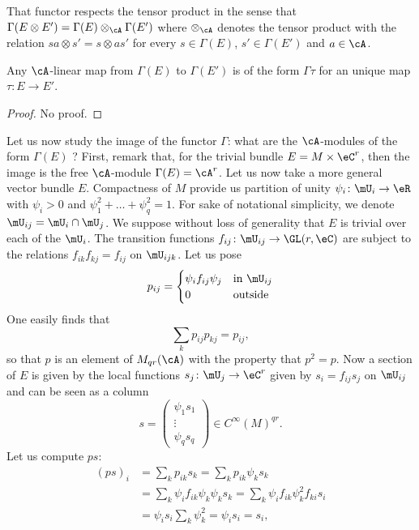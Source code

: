 That functor respects the tensor product in the sense that $\Gamma(E\otimes E')=\Gamma(E)\otimes_{\cA}\Gamma(E')$ where $\otimes_{\cA}$ denotes the tensor product with the relation $sa\otimes s'=s\otimes as'$ for every $s\in\Gamma(E)$, $s'\in\Gamma(E')$ and $a\in\cA$.

\begin{proposition}
Any $\cA$-linear map from $\Gamma(E)$ to $\Gamma(E')$ is of the form $\Gamma\tau$ for an unique map $\tau\colon E\to E'$.
\end{proposition}

\begin{proof}
No proof.
\end{proof}

Let us now study the image of the functor $\Gamma$: what are the $\cA$-modules of the form $\Gamma(E)$ ? First, remark that, for the trivial bundle $E=M\times\eC^r$, then the image is the free $\cA$-module $\Gamma(E)=\cA^r$. Let us now take a more general vector bundle $E$. Compactness of $M$ provide us partition of unity $\psi_i\colon  \mU_i\to \eR$ with $\psi_i>0$ and $\psi_1^2+\ldots+\psi_q^2=1$. For sake of notational simplicity, we denote $\mU_{ij}=\mU_i\cap\mU_j$.  We suppose without loss of generality that $E$ is trivial over each of the $\mU_i$. The transition functions $f_{ij}\colon \mU_{ij}\to \GL(r,\eC)$ are subject to the relations $f_{ik}f_{kj}=f_{ij}$ on $\mU_{ijk}$. Let us pose
\begin{equation}
 p_{ij}=
\begin{cases}
	\psi_if_{ij}\psi_j&\text{in $\mU_{ij}$}\\
	0&\text{outside}
\end{cases}
\end{equation}
One easily finds that
\[ 
  \sum_kp_{ij}p_{kj}=p_{ij},
\]
so that $p$ is an element of $M_{qr}(\cA)$ with the property that $p^2=p$. Now a section of $E$ is given by the local functions $s_j\colon \mU_j\to \eC^r$ given by $s_i=f_{ij}s_j$ on $\mU_{ij}$ and can be seen as a column
\begin{equation}
s=
\begin{pmatrix}
\psi_1s_1\\\vdots\\\psi_qs_q
\end{pmatrix}\in C^{\infty}(M)^{qr}.
\end{equation}
Let us compute $ps$:
\[ 
\begin{split}
(ps)_i	&=\sum_kp_{ik}s_k
	=\sum_kp_{ik}\psi_ks_k\\
	&=\sum_k\psi_if_{ik}\psi_k\psi_ks_k
	=\sum_k\psi_if_{ik}\psi_k^2f_{ki}s_i\\
	&=\psi_is_i\sum_k\psi_k^2
	=\psi_is_i=s_i,
\end{split}  
\]
